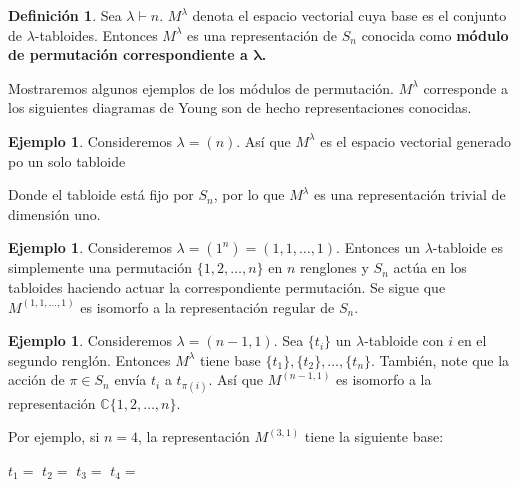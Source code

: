 \documentclass[12pt]{book}
\theoremstyle{definition}
\newtheorem{definition}[theorem]{Definición}
\newtheorem{example}[theorem]{Ejemplo}
\newcounter{in}
\newcounter{ini}
\begin{document}
\begin{definition}
  Sea $\lambda\vdash n$. $M^{\lambda}$ denota el espacio vectorial
  cuya base es el conjunto de $\lambda$-tabloides. Entonces
  $M^{\lambda}$ es una representación de $S_{n}$ conocida como \textbf{módulo
  de permutación correspondiente a $\boldsymbol{\lambda}$.}
\end{definition}

Mostraremos algunos ejemplos de los módulos de
permutación. $M^{\lambda}$ corresponde a los siguientes diagramas de
Young son de hecho representaciones conocidas.

\begin{center}
   \qquad
  \qquad
\end{center}

\begin{example}
  Consideremos $\lambda=(n)$. Así que $M^{\lambda}$ es el espacio
  vectorial generado po un solo tabloide 
  \begin{center}
  \end{center}
Donde el tabloide está fijo por $S_{n}$, por lo que $M^{\lambda}$ es
una representación trivial de dimensión uno.
\end{example}

\begin{example}
  Consideremos $\lambda=(1^{n})=(1,1,\ldots,1)$. Entonces un $\lambda$-tabloide es
  simplemente una permutación $\{1,2,\ldots,n\}$ en $n$ renglones y $S_{n}$ actúa en los
  tabloides haciendo actuar la correspondiente permutación. Se sigue que $M^{(1,1,\ldots,1)}$ es
  isomorfo a la representación regular de $S_{n}$.
\end{example}

\begin{example}
  \label{tabloides-ejemplo}
  Consideremos
  $\lambda=(n-1,1)$. Sea $\{t_{i}\}$
  un $\lambda$-tabloide con $i$ en
  el segundo renglón. Entonces
  $M^{\lambda}$ tiene base
  $\{t_{1}\},\{t_{2}\},\ldots,\{t_{n}\}$. También,
  note que la acción de $\pi\in
  S_{n}$ envía $t_{i}$ a $t_{\pi(i)}$. Así que
  $M^{(n-1,1)}$ es isomorfo a la
  representación $\mathbb{C}\{1,2,\ldots,n\}$. 

  Por ejemplo, si $n=4$, la
  representación $M^{(3,1)}$ tiene
  la siguiente base:
  \begin{center}
    $t_{1}=$\qquad 
    $t_{2}=$ \qquad
    $t_{3}=$ \qquad
    $t_{4}=$ \qquad
  \end{center}
\end{example}
\end{document}
